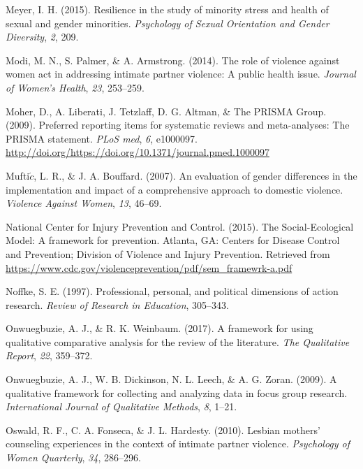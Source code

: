 \documentclass[11pt,]{tufte-book}
\begin{document}
\hypertarget{ref-meyer2015resilience}{}
Meyer, I. H. (2015). Resilience in the study of minority stress and
health of sexual and gender minorities. \emph{Psychology of Sexual
Orientation and Gender Diversity}, \emph{2}, 209.

\hypertarget{ref-modi2014role}{}
Modi, M. N., S. Palmer, \& A. Armstrong. (2014). The role of violence
against women act in addressing intimate partner violence: A public
health issue. \emph{Journal of Women's Health}, \emph{23}, 253--259.

\hypertarget{ref-moher2009preferred}{}
Moher, D., A. Liberati, J. Tetzlaff, D. G. Altman, \& The PRISMA Group.
(2009). Preferred reporting items for systematic reviews and
meta-analyses: The PRISMA statement. \emph{PLoS med}, \emph{6},
e1000097.
\url{http://doi.org/https://doi.org/10.1371/journal.pmed.1000097}

\hypertarget{ref-muftic2007evaluation}{}
Mufti\(\acute{c}\), L. R., \& J. A. Bouffard. (2007). An evaluation of
gender differences in the implementation and impact of a comprehensive
approach to domestic violence. \emph{Violence Against Women}, \emph{13},
46--69.

\hypertarget{ref-centers2015social}{}
National Center for Injury Prevention and Control. (2015). The
Social-Ecological Model: A framework for prevention. Atlanta, GA:
Centers for Disease Control and Prevention; Division of Violence and
Injury Prevention. Retrieved from
\url{https://www.cdc.gov/violenceprevention/pdf/sem_framewrk-a.pdf}

\hypertarget{ref-noffke1997professional}{}
Noffke, S. E. (1997). Professional, personal, and political dimensions
of action research. \emph{Review of Research in Education}, 305--343.

\hypertarget{ref-onwuegbuzie2017framework}{}
Onwuegbuzie, A. J., \& R. K. Weinbaum. (2017). A framework for using
qualitative comparative analysis for the review of the literature.
\emph{The Qualitative Report}, \emph{22}, 359--372.

\hypertarget{ref-onwuegbuzie2009qualitative}{}
Onwuegbuzie, A. J., W. B. Dickinson, N. L. Leech, \& A. G. Zoran.
(2009). A qualitative framework for collecting and analyzing data in
focus group research. \emph{International Journal of Qualitative
Methods}, \emph{8}, 1--21.

\hypertarget{ref-oswald2010lesbian}{}
Oswald, R. F., C. A. Fonseca, \& J. L. Hardesty. (2010). Lesbian
mothers' counseling experiences in the context of intimate partner
violence. \emph{Psychology of Women Quarterly}, \emph{34}, 286--296.
\end{document}
